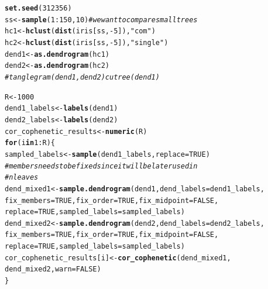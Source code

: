 \documentclass[shortnames,nojss,article]{jss}\usepackage[]{graphicx}\usepackage[]{color}
\makeatletter
\newcommand{\hlnum}[1]{\textcolor[rgb]{0.686,0.059,0.569}{#1}}%
\newcommand{\hlstr}[1]{\textcolor[rgb]{0.192,0.494,0.8}{#1}}%
\newcommand{\hlcom}[1]{\textcolor[rgb]{0.678,0.584,0.686}{\textit{#1}}}%
\newcommand{\hlopt}[1]{\textcolor[rgb]{0,0,0}{#1}}%
\newcommand{\hlstd}[1]{\textcolor[rgb]{0.345,0.345,0.345}{#1}}%
\newcommand{\hlkwa}[1]{\textcolor[rgb]{0.161,0.373,0.58}{\textbf{#1}}}%
\newcommand{\hlkwb}[1]{\textcolor[rgb]{0.69,0.353,0.396}{#1}}%
\newcommand{\hlkwc}[1]{\textcolor[rgb]{0.333,0.667,0.333}{#1}}%
\newcommand{\hlkwd}[1]{\textcolor[rgb]{0.737,0.353,0.396}{\textbf{#1}}}%
\newenvironment{kframe}{%
 \def\at@end@of@kframe{}%
 \ifinner\ifhmode%
  \def\at@end@of@kframe{\end{minipage}}%
  \begin{minipage}{\columnwidth}%
 \fi\fi%
 \def\FrameCommand##1{\hskip\@totalleftmargin \hskip-\fboxsep
 \colorbox{shadecolor}{##1}\hskip-\fboxsep
     \hskip-\linewidth \hskip-\@totalleftmargin \hskip\columnwidth}%
 \MakeFramed {\advance\hsize-\width
   \@totalleftmargin\z@ \linewidth\hsize
   \@setminipage}}%
 {\par\unskip\endMakeFramed%
 \at@end@of@kframe}
\newenvironment{knitrout}{}{} %
\makeatother
\begin{document}
\begin{knitrout}
\color{fgcolor}\begin{kframe}
\begin{alltt}
\hlkwd{set.seed}\hlstd{(}\hlnum{312356}\hlstd{)}
\hlstd{ss} \hlkwb{<-} \hlkwd{sample}\hlstd{(}\hlnum{1}\hlopt{:}\hlnum{150}\hlstd{,} \hlnum{10}\hlstd{)}  \hlcom{# we want to compare small trees}
\hlstd{hc1} \hlkwb{<-} \hlkwd{hclust}\hlstd{(}\hlkwd{dist}\hlstd{(iris[ss,} \hlopt{-}\hlnum{5}\hlstd{]),} \hlstr{"com"}\hlstd{)}
\hlstd{hc2} \hlkwb{<-} \hlkwd{hclust}\hlstd{(}\hlkwd{dist}\hlstd{(iris[ss,} \hlopt{-}\hlnum{5}\hlstd{]),} \hlstr{"single"}\hlstd{)}
\hlstd{dend1} \hlkwb{<-} \hlkwd{as.dendrogram}\hlstd{(hc1)}
\hlstd{dend2} \hlkwb{<-} \hlkwd{as.dendrogram}\hlstd{(hc2)}
\hlcom{# tanglegram(dend1, dend2) cutree(dend1)}

\hlstd{R} \hlkwb{<-} \hlnum{1000}
\hlstd{dend1_labels} \hlkwb{<-} \hlkwd{labels}\hlstd{(dend1)}
\hlstd{dend2_labels} \hlkwb{<-} \hlkwd{labels}\hlstd{(dend2)}
\hlstd{cor_cophenetic_results} \hlkwb{<-} \hlkwd{numeric}\hlstd{(R)}
\hlkwa{for} \hlstd{(i} \hlkwa{in} \hlnum{1}\hlopt{:}\hlstd{R) \{}
    \hlstd{sampled_labels} \hlkwb{<-} \hlkwd{sample}\hlstd{(dend1_labels,} \hlkwc{replace} \hlstd{=} \hlnum{TRUE}\hlstd{)}
    \hlcom{# members needs to be fixed since it will be later used in}
    \hlcom{# nleaves}
    \hlstd{dend_mixed1} \hlkwb{<-} \hlkwd{sample.dendrogram}\hlstd{(dend1,} \hlkwc{dend_labels} \hlstd{= dend1_labels,}
        \hlkwc{fix_members} \hlstd{=} \hlnum{TRUE}\hlstd{,} \hlkwc{fix_order} \hlstd{=} \hlnum{TRUE}\hlstd{,} \hlkwc{fix_midpoint} \hlstd{=} \hlnum{FALSE}\hlstd{,}
        \hlkwc{replace} \hlstd{=} \hlnum{TRUE}\hlstd{,} \hlkwc{sampled_labels} \hlstd{= sampled_labels)}
    \hlstd{dend_mixed2} \hlkwb{<-} \hlkwd{sample.dendrogram}\hlstd{(dend2,} \hlkwc{dend_labels} \hlstd{= dend2_labels,}
        \hlkwc{fix_members} \hlstd{=} \hlnum{TRUE}\hlstd{,} \hlkwc{fix_order} \hlstd{=} \hlnum{TRUE}\hlstd{,} \hlkwc{fix_midpoint} \hlstd{=} \hlnum{FALSE}\hlstd{,}
        \hlkwc{replace} \hlstd{=} \hlnum{TRUE}\hlstd{,} \hlkwc{sampled_labels} \hlstd{= sampled_labels)}
    \hlstd{cor_cophenetic_results[i]} \hlkwb{<-} \hlkwd{cor_cophenetic}\hlstd{(dend_mixed1,}
        \hlstd{dend_mixed2,} \hlkwc{warn} \hlstd{=} \hlnum{FALSE}\hlstd{)}
\hlstd{\}}



\end{alltt}
\end{kframe}
\end{knitrout}
\end{document}
